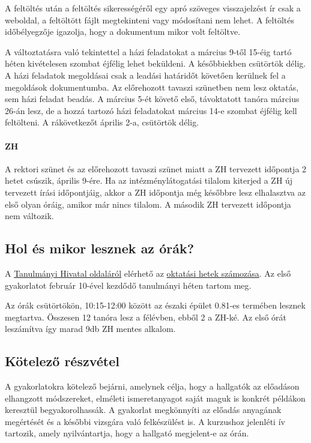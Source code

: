\documentclass[12pt,a4paper]{scrartcl}
\begin{document}
A feltöltés után a feltöltés sikerességéről egy apró szöveges visszajelzést ír csak a weboldal, a feltöltött fájlt megtekinteni vagy módosítani nem lehet. A feltöltés időbélyegzője igazolja, hogy a dokumentum mikor volt feltöltve.

A változtatásra való tekintettel a házi feladatokat a március 9-től 15-éig tartó héten kivételesen szombat éjfélig lehet beküldeni. A későbbiekben csütörtök délig. A házi feladatok megoldásai csak a leadási határidőt követően kerülnek fel a megoldások dokumentumba. Az előrehozott tavaszi szünetben nem lesz oktatás, sem házi feladat beadás. A március 5-ét követő első, távoktatott tanóra március 26-án lesz, de a hozzá tartozó házi feladatokat március 14-e szombat éjfélig kell feltölteni. A rákövetkezőt április 2-a, csütörtök délig.

\paragraph{ZH}
A rektori szünet és az előrehozott tavaszi szünet miatt a ZH tervezett időpontja 2 hetet csúszik, április 9-ére. Ha az intézménylátogatási tilalom kiterjed a ZH új tervezett írási időpontjáig, akkor a ZH időpontja még későbbre lesz elhalasztva az első olyan óráig, amikor már nincs tilalom. A második ZH tervezett időpontja nem változik.

\subsection{Hol és mikor lesznek az órák?}
A \href{http://to.ttk.elte.hu}{Tanulmányi Hivatal oldaláról} elérhető az \href{http://to.ttk.elte.hu/sites/default/files/201920_1_2fev_oktatasihetek_22.xls}{oktatási hetek számozása}. Az első gyakorlatot február 10-ével kezdődő tanulmányi héten tartom meg.

Az órák csütörtökön, 10:15-12:00 között az északi épület 0.81-es termében lesznek megtartva. Összesen 12 tanóra lesz a félévben, ebből 2 a ZH-ké. Az első órát leszámítva így marad 9db ZH mentes alkalom.

\subsection{Kötelező részvétel}
A gyakorlatokra kötelező bejárni, amelynek célja, hogy a hallgatók az előadáson elhangzott módszereket, elméleti ismeretanyagot saját maguk is konkrét példákon keresztül begyakorolhassák. A gyakorlat megkönnyíti az előadás anyagának megértését és a későbbi vizsgára való felkészülést is. A kurzushoz jelenléti ív tartozik, amely nyilvántartja, hogy a hallgató megjelent-e az órán.
\end{document}
